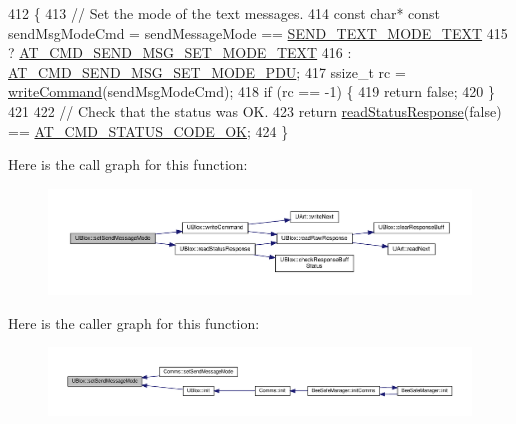 \begin{DoxyCode}
412 \{
413     \textcolor{comment}{// Set the mode of the text messages.}
414     \textcolor{keyword}{const} \textcolor{keywordtype}{char}* \textcolor{keyword}{const} sendMsgModeCmd = sendMessageMode == \hyperlink{_u_blox_8h_a4fdc1adf2ea333d6490119160a35401a}{SEND\_TEXT\_MODE\_TEXT}
415                                    ? \hyperlink{_u_blox_8cpp_aeb1209bd42562b052073f701f1f83487}{AT\_CMD\_SEND\_MSG\_SET\_MODE\_TEXT}
416                                    : \hyperlink{_u_blox_8cpp_a74e9299c0c9318c9b901d5283a1644f4}{AT\_CMD\_SEND\_MSG\_SET\_MODE\_PDU};
417     ssize\_t rc = \hyperlink{class_u_blox_af604d1897a66192bf1c2a11997f2634d}{writeCommand}(sendMsgModeCmd);
418     \textcolor{keywordflow}{if} (rc == -1) \{
419         \textcolor{keywordflow}{return} \textcolor{keyword}{false};
420     \}
421 
422     \textcolor{comment}{// Check that the status was OK.}
423     \textcolor{keywordflow}{return} \hyperlink{class_u_blox_a4eaca5b1b1c4b5b6f6164b220dd43e0b}{readStatusResponse}(\textcolor{keyword}{false}) == \hyperlink{_u_blox_8cpp_a6ebc1682eb6b9964fccb4a61688ff307}{AT\_CMD\_STATUS\_CODE\_OK};
424 \}
\end{DoxyCode}
Here is the call graph for this function\+:
\nopagebreak
\begin{figure}[H]
\begin{center}
\leavevmode
\includegraphics[width=350pt]{da/df6/class_u_blox_a12c1042d3bcb503b025927fd53d54243_cgraph}
\end{center}
\end{figure}
Here is the caller graph for this function\+:
\nopagebreak
\begin{figure}[H]
\begin{center}
\leavevmode
\includegraphics[width=350pt]{da/df6/class_u_blox_a12c1042d3bcb503b025927fd53d54243_icgraph}
\end{center}
\end{figure}
\mbox{\label{class_u_blox_a2e816e864ebf43743b3f6187e20c2b1f}} 
